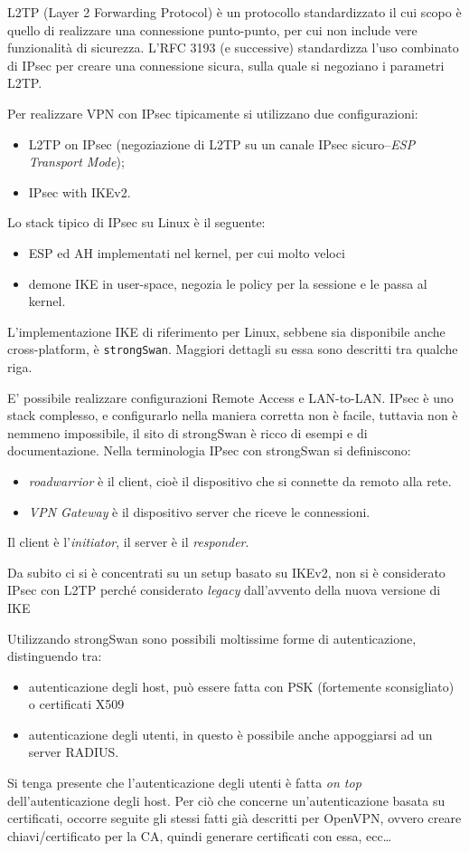 L2TP (Layer 2 Forwarding Protocol) è un protocollo standardizzato il cui scopo è quello
di realizzare una connessione punto-punto, per cui non include vere funzionalità
di sicurezza. L'RFC 3193 (e successive) standardizza l'uso combinato di IPsec per creare una
connessione sicura, sulla quale si negoziano
i parametri L2TP.


Per realizzare VPN con IPsec tipicamente si utilizzano due configurazioni:
\begin{itemize}
  \item L2TP on IPsec (negoziazione di L2TP su un canale IPsec sicuro--\textit{ESP Transport Mode});
  \item IPsec with IKEv2.
\end{itemize}


Lo stack tipico di IPsec su Linux è il seguente:
\begin{itemize}
  \item ESP ed AH implementati nel kernel, per cui molto veloci
  \item demone IKE in user-space, negozia le policy per la sessione e le
  passa al kernel.
\end{itemize}
L'implementazione IKE di riferimento per Linux, sebbene sia disponibile anche
cross-platform, è \texttt{strongSwan}. Maggiori dettagli su essa sono descritti
tra qualche riga.


E' possibile realizzare configurazioni Remote Access e LAN-to-LAN. IPsec è uno stack
complesso, e configurarlo nella maniera corretta non è facile, tuttavia non è nemmeno
impossibile, il sito di strongSwan è ricco di esempi e di documentazione.
Nella terminologia IPsec con strongSwan si definiscono:
\begin{itemize}
  \item \textit{roadwarrior} è il client, cioè il dispositivo che si connette da remoto alla rete.
  \item \textit{VPN Gateway} è il dispositivo server che riceve le connessioni.
\end{itemize}
Il client è l'\textit{initiator},
il server è il \textit{responder}.

Da subito ci si è concentrati su un setup basato su IKEv2, non si è considerato IPsec con L2TP
perché considerato \textit{legacy} dall'avvento della nuova versione di IKE

Utilizzando strongSwan sono possibili moltissime forme di autenticazione, distinguendo tra:
\begin{itemize}
  \item autenticazione degli host, può essere fatta con PSK (fortemente sconsigliato) o certificati X509
  \item autenticazione degli utenti, in questo è possibile anche appoggiarsi ad un
  server RADIUS.
\end{itemize}
Si tenga presente che l'autenticazione degli utenti è fatta \textit{on top} dell'autenticazione
degli host.
Per ciò che concerne un'autenticazione basata su certificati, occorre seguite gli stessi
fatti già descritti per OpenVPN, ovvero creare chiavi/certificato per la CA, quindi generare
certificati con essa, ecc\ldots


